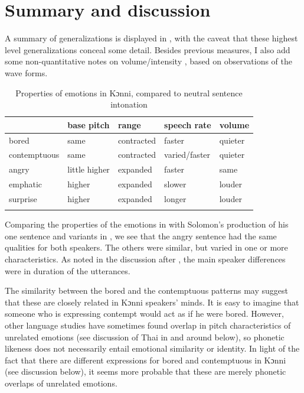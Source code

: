 \documentclass[output=paper]{langsci/langscibook}
\begin{document}
\section{Summary and discussion}

A summary of generalizations is displayed in , with the caveat that these highest level generalizations conceal some detail. Besides previous measures, I also add some non-quantitative notes on volume/intensity , based on observations of the wave forms. 


\begin{table}
\begin{tabular}{lllll} 
\lsptoprule
& base pitch & range & speech rate & volume\\\midrule
bored & same & contracted & faster & quieter\\
contemptuous & same & contracted & varied/faster & quieter\\
angry & little higher & expanded & faster & same\\
emphatic & higher & expanded & slower & louder\\
surprise & higher & expanded & longer & louder\\
\lspbottomrule
\end{tabular}

\caption{Properties of emotions in Kɔnni, compared to neutral sentence intonation}
\label{tab:5.cahill}

\end{table}


Comparing the properties of the emotions in  with Solomon's production of his one sentence and variants in , we see that the angry sentence had the same qualities for both speakers. The others were similar, but varied in one or more characteristics. As noted in the discussion after , the main speaker differences were in duration of the utterances.

The similarity between the bored and the contemptuous patterns may suggest that these are closely related in Kɔnni speakers' minds. It is easy to imagine that someone who is expressing contempt would act as if he were bored. However, other language studies have sometimes found overlap in pitch characteristics of unrelated emotions (see discussion of Thai in and around  below), so phonetic likeness does not necessarily entail emotional similarity or identity. In light of the fact that there are different expressions for bored and contemptuous in Kɔnni (see discussion below), it seems more probable that these are merely phonetic overlaps of unrelated emotions.
\end{document}

